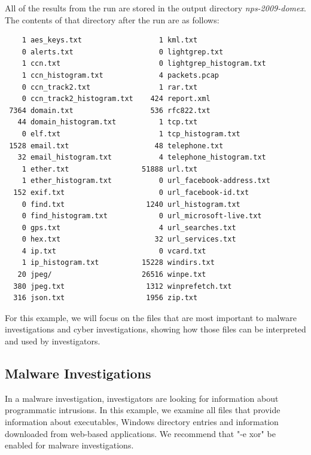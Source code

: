 All of the results from the \bulk run are stored in the output directory \textit{nps-2009-domex}. The contents of that directory after the run are as follows:

\begingroup
\footnotesize
\begin{Verbatim}
    1 aes_keys.txt                  1 kml.txt
    0 alerts.txt                    0 lightgrep.txt
    1 ccn.txt                       0 lightgrep_histogram.txt
    1 ccn_histogram.txt             4 packets.pcap
    0 ccn_track2.txt                1 rar.txt
    0 ccn_track2_histogram.txt    424 report.xml
 7364 domain.txt                  536 rfc822.txt
   44 domain_histogram.txt          1 tcp.txt
    0 elf.txt                       1 tcp_histogram.txt
 1528 email.txt                    48 telephone.txt
   32 email_histogram.txt           4 telephone_histogram.txt
    1 ether.txt                 51888 url.txt
    1 ether_histogram.txt           0 url_facebook-address.txt
  152 exif.txt                      0 url_facebook-id.txt
    0 find.txt                   1240 url_histogram.txt
    0 find_histogram.txt            0 url_microsoft-live.txt
    0 gps.txt                       4 url_searches.txt
    0 hex.txt                      32 url_services.txt
    4 ip.txt                        0 vcard.txt
    1 ip_histogram.txt          15228 windirs.txt
   20 jpeg/                     26516 winpe.txt
  380 jpeg.txt                   1312 winprefetch.txt
  316 json.txt                   1956 zip.txt
\end{Verbatim} 
\endgroup
For this example, we will focus on the files that are most important to malware investigations and cyber investigations, showing how those files can be interpreted and used by investigators.

\subsection{Malware Investigations}
In a malware investigation, investigators are looking for information about programmatic intrusions. In this example, we examine all files that provide information about executables, Windows directory entries and information downloaded from web-based applications. We recommend that "-e xor" be enabled for malware investigations.\\

